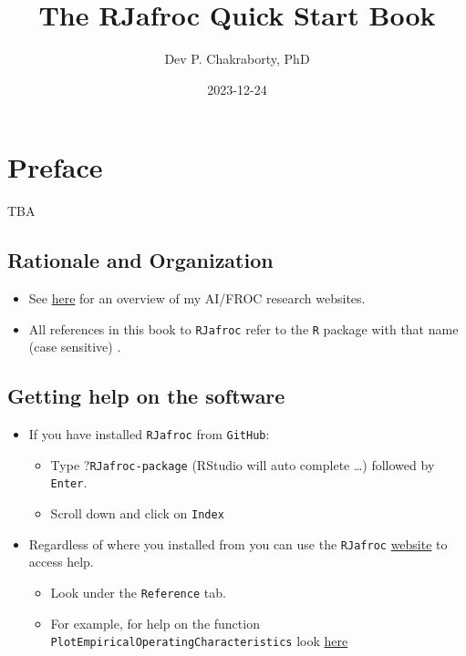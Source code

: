 \documentclass[
]{book}
\title{The RJafroc Quick Start Book}
\author{Dev P. Chakraborty, PhD}
\date{2023-12-24}
\providecommand{\tightlist}{%
  \setlength{\itemsep}{0pt}\setlength{\parskip}{0pt}}
\begin{document}
\maketitle

{
\setcounter{tocdepth}{1}
\tableofcontents
}
\hypertarget{quick-start-index-preface}{%
\chapter{Preface}\label{quick-start-index-preface}}

TBA

\hypertarget{quick-start-index-rationale-and-organization}{%
\section{Rationale and Organization}\label{quick-start-index-rationale-and-organization}}

\begin{itemize}
\tightlist
\item
  See \href{https://dpc10ster.github.io/ai-froc-research/}{here} for an overview of my AI/FROC research websites.
\item
  All references in this book to \texttt{RJafroc} refer to the \texttt{R} package with that name (case sensitive) \citep{R-RJafroc}.
\end{itemize}

\hypertarget{quick-start-index-getting-help}{%
\section{Getting help on the software}\label{quick-start-index-getting-help}}

\begin{itemize}
\tightlist
\item
  If you have installed \texttt{RJafroc} from \texttt{GitHub}:

  \begin{itemize}
  \tightlist
  \item
    Type ?\texttt{RJafroc-package} (RStudio will auto complete \ldots) followed by \texttt{Enter}.
  \item
    Scroll down and click on \texttt{Index}
  \end{itemize}
\item
  Regardless of where you installed from you can use the \texttt{RJafroc} \href{https://dpc10ster.github.io/RJafroc/}{website} to access help.

  \begin{itemize}
  \tightlist
  \item
    Look under the \texttt{Reference} tab.
  \item
    For example, for help on the function \texttt{PlotEmpiricalOperatingCharacteristics} look \href{https://dpc10ster.github.io/RJafroc/reference/PlotEmpiricalOperatingCharacteristics.html}{here}
  \end{itemize}
\end{itemize}
\end{document}
